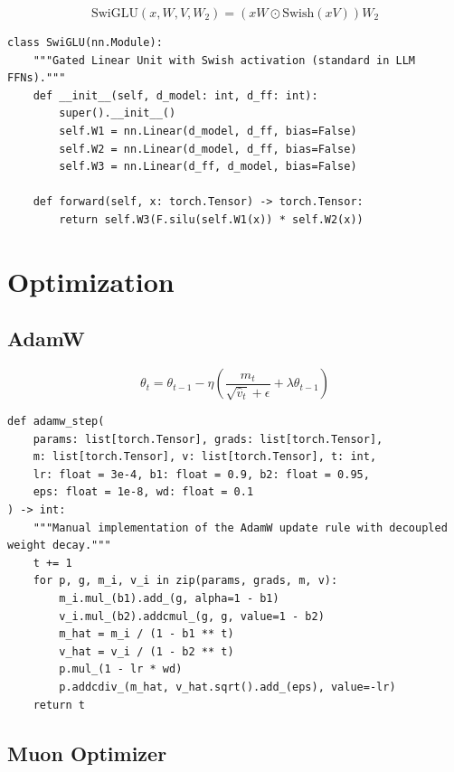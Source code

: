 \[
  \mathrm{SwiGLU}(x, W, V, W_2) = (x W \odot \mathrm{Swish}(x V)) W_2
\]

\begin{lstlisting}[style=pythonstyle, caption={SwiGLU FFN}, label=lst:swiglu]
class SwiGLU(nn.Module):
    """Gated Linear Unit with Swish activation (standard in LLM FFNs)."""
    def __init__(self, d_model: int, d_ff: int):
        super().__init__()
        self.W1 = nn.Linear(d_model, d_ff, bias=False)
        self.W2 = nn.Linear(d_model, d_ff, bias=False)
        self.W3 = nn.Linear(d_ff, d_model, bias=False)

    def forward(self, x: torch.Tensor) -> torch.Tensor:
        return self.W3(F.silu(self.W1(x)) * self.W2(x))
\end{lstlisting}

\section{Optimization}
\label{app:optim}

\subsection{AdamW}
\label{form:adamw}

\[
  \theta_t = \theta_{t-1} - \eta \left(\frac{\hat{m}_t}{\sqrt{\hat{v}_t}+\epsilon} + \lambda \theta_{t-1}\right)
\]

\begin{lstlisting}[style=pythonstyle, caption={AdamW update step (manual)}, label=lst:adamw]
def adamw_step(
    params: list[torch.Tensor], grads: list[torch.Tensor], 
    m: list[torch.Tensor], v: list[torch.Tensor], t: int,
    lr: float = 3e-4, b1: float = 0.9, b2: float = 0.95, 
    eps: float = 1e-8, wd: float = 0.1
) -> int:
    """Manual implementation of the AdamW update rule with decoupled weight decay."""
    t += 1
    for p, g, m_i, v_i in zip(params, grads, m, v):
        m_i.mul_(b1).add_(g, alpha=1 - b1)
        v_i.mul_(b2).addcmul_(g, g, value=1 - b2)
        m_hat = m_i / (1 - b1 ** t)
        v_hat = v_i / (1 - b2 ** t)
        p.mul_(1 - lr * wd)
        p.addcdiv_(m_hat, v_hat.sqrt().add_(eps), value=-lr)
    return t
\end{lstlisting}

\subsection{Muon Optimizer}
\label{form:muon}

